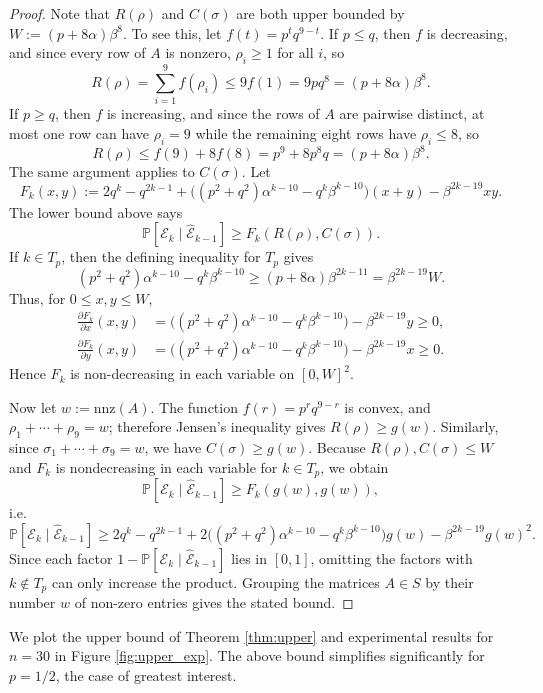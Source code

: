 \documentclass[reqno]{amsart}
\numberwithin{equation}{section}
\begin{document}
\begin{proof}
Note that $R(\rho)$ and $C(\sigma)$ are both upper bounded by $W:=(p + 8 \alpha) \beta^8$. To see this, let $f(t)=p^tq^{9-t}$. If $p\le q$, then $f$ is decreasing, and since every row of $A$ is nonzero, $\rho_i\ge1$ for all $i$, so
\[R(\rho)=\sum_{i=1}^9 f(\rho_i)\le 9f(1)=9pq^8=(p+8\alpha)\beta^8.\]
If $p\ge q$, then $f$ is increasing, and since the rows of $A$ are pairwise distinct, at most one row can have $\rho_i=9$ while the remaining eight rows have $\rho_i\le8$, so
\[R(\rho)\le f(9)+8f(8)=p^9+8p^8q=(p+8\alpha)\beta^8.\]
The same argument applies to $C(\sigma)$. Let
\[F_k(x,y):=2q^k-q^{2k-1}+\big((p^2+q^2)\alpha^{k-10}-q^k\beta^{k-10}\big)(x+y)-\beta^{2k-19}xy.\]
The lower bound above says
\[\mathbb{P}\left[\mathcal E_k\mid \mathcal{\hat E}_{k-1}\right] \ge F_k(R(\rho),C(\sigma)).\]
If $k\in T_p$, then the defining inequality for $T_p$ gives
\[(p^2+q^2)\alpha^{k-10}-q^k\beta^{k-10} \ge (p+8\alpha)\beta^{2k-11}=\beta^{2k-19}W.\]
Thus, for $0\le x,y\le W$,
\begin{align*}
    \frac{\partial F_k}{\partial x}(x,y)&=\big((p^2+q^2)\alpha^{k-10}-q^k\beta^{k-10}\big)-\beta^{2k-19}y\ge0, \\
    \frac{\partial F_k}{\partial y}(x,y)&=\big((p^2+q^2)\alpha^{k-10}-q^k\beta^{k-10}\big)-\beta^{2k-19}x\ge0.
\end{align*}
Hence $F_k$ is non-decreasing in each variable on $[0,W]^2$.

Now let $w:=\mathrm{nnz}(A)$. The function $f(r)=p^r q^{9-r}$ is convex, and $\rho_1+\cdots+\rho_9=w$; therefore Jensen's inequality gives $R(\rho)\ge g(w)$. Similarly, since $\sigma_1+\cdots+\sigma_9=w$, we have $C(\sigma)\ge g(w)$. Because $R(\rho),C(\sigma)\le W$ and $F_k$ is nondecreasing in each variable for $k\in T_p$, we obtain
\[\mathbb{P}\left[\mathcal E_k\mid \mathcal{\hat E}_{k-1}\right] \ge F_k(g(w),g(w)),\]
i.e.
\[\mathbb{P}\left[\mathcal E_k\mid \mathcal{\hat E}_{k-1}\right] \ge 2q^k -q^{2k-1} +2\big((p^2 + q^2) \alpha^{k-10} - q^k \beta^{k-10}\big) g(w) -\beta^{2k-19}g(w)^2.\]
Since each factor $1-\mathbb{P}[\mathcal E_k\mid \mathcal{\hat E}_{k-1}]$ lies in $[0,1]$, omitting the factors with $k\notin T_p$ can only increase the product. Grouping the matrices $A\in S$ by their number $w$ of non-zero entries gives the stated bound.\end{proof}

We plot the upper bound of Theorem \ref{thm:upper}  and experimental results for $n = 30$ in Figure \ref{fig:upper_exp}. The above bound simplifies significantly for $p = 1/2$, the case of greatest interest.
\end{document}
